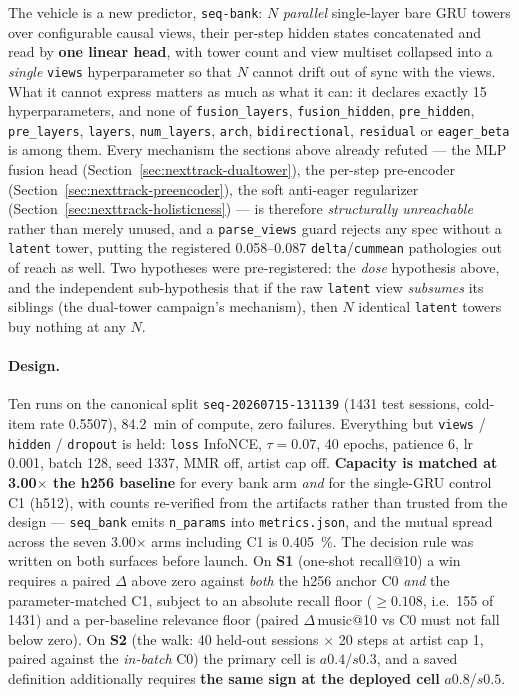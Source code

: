 \documentclass[11pt]{article}
\newcommand{\dsid}[1]{\texttt{\small #1}}
\begin{document}
The vehicle is a new predictor, \texttt{seq-bank}: $N$ \emph{parallel}
single-layer bare GRU towers over configurable causal views, their per-step hidden
states concatenated and read by \textbf{one linear head}, with tower count and
view multiset collapsed into a \emph{single} \texttt{views} hyperparameter so that
$N$ cannot drift out of sync with the views. What it cannot express matters as
much as what it can: it declares exactly \num{15} hyperparameters, and none of
\texttt{fusion\_layers}, \texttt{fusion\_hidden}, \texttt{pre\_hidden},
\texttt{pre\_layers}, \texttt{layers}, \texttt{num\_layers}, \texttt{arch},
\texttt{bidirectional}, \texttt{residual} or \texttt{eager\_beta} is among them.
Every mechanism the sections above already refuted --- the MLP fusion head
(Section~\ref{sec:nexttrack-dualtower}), the per-step pre-encoder
(Section~\ref{sec:nexttrack-preencoder}), the soft anti-eager regularizer
(Section~\ref{sec:nexttrack-holisticness}) --- is therefore \emph{structurally
unreachable} rather than merely unused, and a \texttt{parse\_views} guard rejects
any spec without a \texttt{latent} tower, putting the registered
\numrange{0.058}{0.087} \texttt{delta}/\texttt{cummean} pathologies out of reach
as well. Two hypotheses were pre-registered: the \emph{dose} hypothesis above,
and the independent sub-hypothesis that if the raw \texttt{latent} view
\emph{subsumes} its siblings (the dual-tower campaign's mechanism), then $N$
identical \texttt{latent} towers buy nothing at any $N$.

\paragraph{Design.} Ten runs on the canonical split
\dsid{seq-20260715-131139} (\num{1431} test sessions, cold-item rate
\num{0.5507}), \SI{84.2}{\minute} of compute, zero failures. Everything but
\texttt{views} / \texttt{hidden} / \texttt{dropout} is held: \texttt{loss}
InfoNCE, $\tau=\num{0.07}$, \num{40} epochs, patience \num{6}, lr \num{0.001},
batch \num{128}, seed \num{1337}, MMR off, artist cap off. \textbf{Capacity is
matched at \num{3.00}$\times$ the h256 baseline} for every bank arm \emph{and}
for the single-GRU control C1 (h512), with counts re-verified from the artifacts
rather than trusted from the design --- \texttt{seq\_bank} emits
\texttt{n\_params} into \texttt{metrics.json}, and the mutual spread across the
seven \num{3.00}$\times$ arms including C1 is \SI{0.405}{\percent}. The decision
rule was written on both surfaces before launch. On \textbf{S1} (one-shot
recall@10) a win requires a paired $\Delta$ above zero against \emph{both} the
h256 anchor C0 \emph{and} the parameter-matched C1, subject to an absolute recall
floor ($\ge\num{0.108}$, i.e.\ \num{155} of \num{1431}) and a per-baseline
relevance floor (paired $\Delta$\,music@10 vs C0 must not fall below zero). On
\textbf{S2} (the walk: \num{40} held-out sessions $\times$ \num{20} steps at
artist cap 1, paired against the \emph{in-batch} C0) the primary cell is
$a\num{0.4}$/$s\num{0.3}$, and a saved definition additionally requires
\textbf{the same sign at the deployed cell} $a\num{0.8}$/$s\num{0.5}$.
\end{document}
